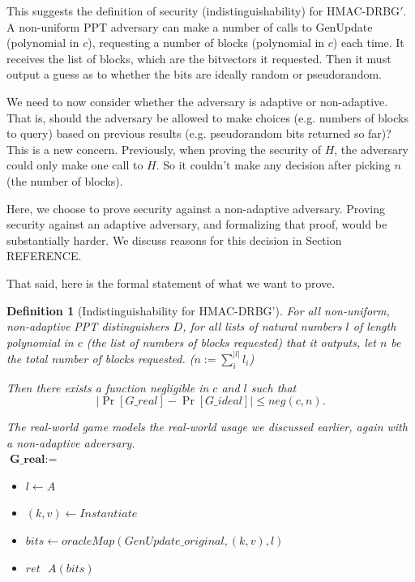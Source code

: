 \documentclass[12pt,lot, lof]{puthesis}
\newenvironment{game}
{ \begin{itemize}[noitemsep,nolistsep] 
}
{ \end{itemize}                  }
\newcommand{\s} {\textrm{ }}
\newcommand{\lar}{\leftarrow}
\newtheorem{dfn}[thm]{Definition}
\begin{document}
{This suggests the definition of security (indistinguishability) for HMAC-DRBG$'$. A non-uniform PPT adversary can make a number of calls to GenUpdate (polynomial in $c$), requesting a number of blocks (polynomial in $c$) each time. It receives the list of blocks, which are the bitvectors it requested. Then it must output a guess as to whether the bits are ideally random or pseudorandom.

We need to now consider whether the adversary is adaptive or non-adaptive. That is, should the adversary be allowed to make choices (e.g. numbers of blocks to query) based on previous results (e.g. pseudorandom bits returned so far)? This is a new concern. Previously, when proving the security of $H$, the adversary could only make one call to $H$. So it couldn't make any decision after picking $n$ (the number of blocks). 

Here, we choose to prove security against a non-adaptive adversary. Proving security against an adaptive adversary, and formalizing that proof, would be substantially harder. We discuss reasons for this decision in Section REFERENCE.

That said, here is the formal statement of what we want to prove.

\begin{dfn}[Indistinguishability for HMAC-DRBG'] \label{def:indist}
For all non-uniform, non-adaptive PPT distinguishers $D$, for all lists of natural numbers $l$ of length polynomial in $c$ (the list of numbers of blocks requested) that it outputs, let $n$ be the total number of blocks requested. ($n := \sum_i^{|l|} l_i$) 

Then there exists a function negligible in $c$ and $l$ such that
$$|\Pr[G\_real] - \Pr[G\_ideal]| \leq neg(c, n).$$

The real-world game models the real-world usage we discussed earlier, again with a non-adaptive adversary.\\

$\textbf{G\_real} := $
\begin{game}
\item[] $l \leftarrow A$
\item[] $(k,v) \leftarrow Instantiate$
\item[] $bits \lar oracleMap(GenUpdate\_original,(k, v),l)$
\item[] $ret \s A(bits)$ \\
\end{game}


\end{dfn}}
\end{document}

